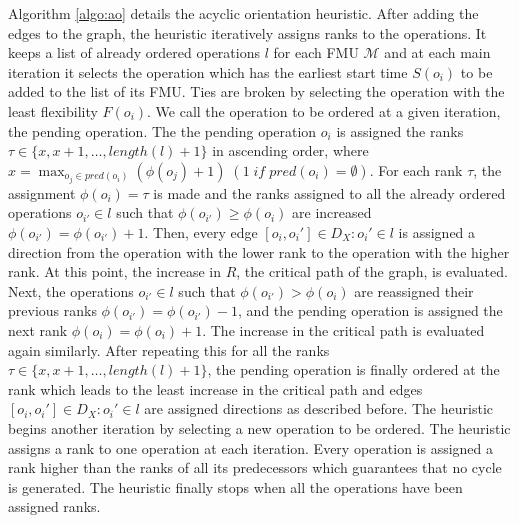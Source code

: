 Algorithm \ref{algo:ao} details the acyclic orientation heuristic. After adding the edges to the graph, the heuristic iteratively assigns ranks to the operations. It keeps a list of already ordered operations $l$ for each FMU $\mathcal{M}$ and at each main iteration it selects the operation which has the earliest start time $S(o_i)$ to be added to the list of its FMU. Ties are broken by selecting the operation with the least flexibility $F(o_i)$. We call the operation to be ordered at a given iteration, the pending operation. The the pending operation $o_i$ is assigned the ranks $\tau \in \{x,x+1, \dots ,length(l)+1\}$ in ascending order, where \mbox{$x = \max_{o_j \in pred(o_i)}(\phi(o_j)+1)\; (1 \; if \; pred(o_i) = \emptyset)$}. For each rank $\tau$, the assignment $\phi(o_i)=\tau$ is made and the ranks assigned to all the already ordered operations $o_{i'} \in l$ such that $\phi(o_{i'}) \geq \phi(o_{i})$ are increased $\phi(o_{i'}) = \phi(o_{i'})+1$. Then, every edge $[o_i,o_i'] \in D_X : o_i' \in l$ is assigned a direction from the operation with the lower rank to the operation with the higher rank. At this point, the increase in $R$, the critical path of the graph, is evaluated. Next, the operations $o_{i'} \in l$ such that $\phi(o_{i'}) > \phi(o_{i})$ are reassigned their previous ranks $\phi(o_{i'}) = \phi(o_{i'})-1$, and the pending operation is assigned the next rank $\phi(o_i)=\phi(o_i)+1$. The increase in the critical path is evaluated again similarly. After repeating this for all the ranks $\tau \in \{x,x+1, \dots ,length(l)+1\}$, the pending operation is finally ordered at the rank which leads to the least increase in the critical path and edges $[o_i,o_i'] \in D_X : o_i' \in l$ are assigned directions as described before. The heuristic begins another iteration by selecting a new operation to be ordered. The heuristic assigns a rank to one operation at each iteration. Every operation is assigned a rank higher than the ranks of all its predecessors which guarantees that no cycle is generated. The heuristic finally stops when all the operations have been assigned ranks.

